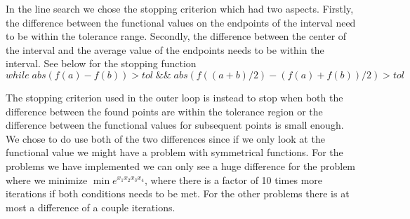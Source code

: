In the line search we chose the stopping criterion which had two aspects. Firstly, the difference between the functional values on the endpoints of the interval need to be within the tolerance range. Secondly, the difference between the center of the interval and the average value of the endpoints needs to be within the interval. See below for the stopping function
$$ while\; abs(f(a)-f(b)) > tol\; \&\&\;abs(f((a+b)/2)-(f(a)+f(b))/2) > tol$$

The stopping criterion used in the outer loop is instead to stop when both the difference between the found points are within the tolerance region or the difference between the functional values for subsequent points is small enough. We chose to do use both of the two differences since if we only look at the functional value we might have a problem with symmetrical functions. For the problems we have implemented we can only see a huge difference for the problem where we minimize $\min e^{x_1 x_2 x_3 x_4} $, where there is a factor of 10 times more iterations if both conditions needs to be met. For the other problems there is at most a difference of a couple iterations.